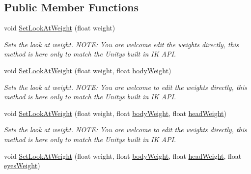 \subsection*{Public Member Functions}
\begin{DoxyCompactItemize}
\item 
void \mbox{\hyperlink{class_root_motion_1_1_final_i_k_1_1_i_k_solver_look_at_a7a358f684518477a24f3d2c7f996ddc2}{Set\+Look\+At\+Weight}} (float weight)
\begin{DoxyCompactList}\small\item\em Sets the look at weight. N\+O\+TE\+: You are welcome edit the weights directly, this method is here only to match the Unity\textquotesingle{}s built in IK A\+PI. \end{DoxyCompactList}\item 
void \mbox{\hyperlink{class_root_motion_1_1_final_i_k_1_1_i_k_solver_look_at_ad1244f571632dab73bcd1a8035a4cd9e}{Set\+Look\+At\+Weight}} (float weight, float \mbox{\hyperlink{class_root_motion_1_1_final_i_k_1_1_i_k_solver_look_at_a40750b4da8c784f94c0b166458b9c8d5}{body\+Weight}})
\begin{DoxyCompactList}\small\item\em Sets the look at weight. N\+O\+TE\+: You are welcome to edit the weights directly, this method is here only to match the Unity\textquotesingle{}s built in IK A\+PI. \end{DoxyCompactList}\item 
void \mbox{\hyperlink{class_root_motion_1_1_final_i_k_1_1_i_k_solver_look_at_aa4341dd272f0c057bb1e9fa0c85deba1}{Set\+Look\+At\+Weight}} (float weight, float \mbox{\hyperlink{class_root_motion_1_1_final_i_k_1_1_i_k_solver_look_at_a40750b4da8c784f94c0b166458b9c8d5}{body\+Weight}}, float \mbox{\hyperlink{class_root_motion_1_1_final_i_k_1_1_i_k_solver_look_at_a81105cdff06d5efcc81b7052570fef23}{head\+Weight}})
\begin{DoxyCompactList}\small\item\em Sets the look at weight. N\+O\+TE\+: You are welcome to edit the weights directly, this method is here only to match the Unity\textquotesingle{}s built in IK A\+PI. \end{DoxyCompactList}\item 
void \mbox{\hyperlink{class_root_motion_1_1_final_i_k_1_1_i_k_solver_look_at_a6ee87acb25f784af7f2eb7ed56fceed0}{Set\+Look\+At\+Weight}} (float weight, float \mbox{\hyperlink{class_root_motion_1_1_final_i_k_1_1_i_k_solver_look_at_a40750b4da8c784f94c0b166458b9c8d5}{body\+Weight}}, float \mbox{\hyperlink{class_root_motion_1_1_final_i_k_1_1_i_k_solver_look_at_a81105cdff06d5efcc81b7052570fef23}{head\+Weight}}, float \mbox{\hyperlink{class_root_motion_1_1_final_i_k_1_1_i_k_solver_look_at_a8ba8c5444746a73418df26ed95bc354e}{eyes\+Weight}})

\end{DoxyCompactItemize}
